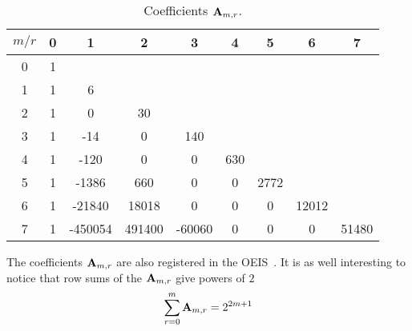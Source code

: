 \begin{table}[H]
    \begin{center}
        \setlength\extrarowheight{-6pt}
        \begin{tabular}{c|cccccccc}
            $m/r$ & 0 & 1       & 2      & 3      & 4   & 5    & 6     & 7 \\ [3px]
            \hline
            0     & 1 &         &        &        &     &      &       &       \\
            1     & 1 & 6       &        &        &     &      &       &       \\
            2     & 1 & 0       & 30     &        &     &      &       &       \\
            3     & 1 & -14     & 0      & 140    &     &      &       &       \\
            4     & 1 & -120    & 0      & 0      & 630 &      &       &       \\
            5     & 1 & -1386   & 660    & 0      & 0   & 2772 &       &       \\
            6     & 1 & -21840  & 18018  & 0      & 0   & 0    & 12012 &       \\
            7     & 1 & -450054 & 491400 & -60060 & 0   & 0    & 0     & 51480
        \end{tabular}
    \end{center}
    \caption{Coefficients ${\mathbf{A}} \sb{m,r}$.}
    \label{tab:table_of_coefficients_a}
\end{table}
The coefficients ${\mathbf{A}} \sb{m,r}$ are also registered in the OEIS~\cite{kolosov2018numerator,kolosov2018denominator}.
It is as well interesting to notice that row sums of the ${\mathbf{A}} \sb{m,r}$ give powers of $2$
\begin{equation*}
    \sum_{r=0}^{m} {\mathbf{A}} \sb{m,r} = 2^{2m+1}
\end{equation*}
